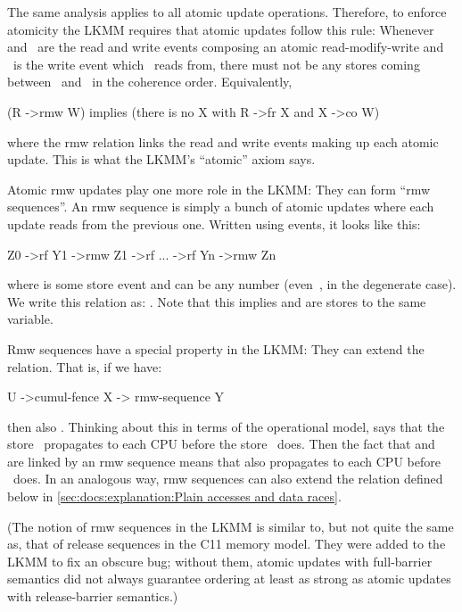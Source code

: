 The same analysis applies to all atomic update operations.
Therefore, to enforce atomicity the LKMM requires that atomic
updates follow this rule:
Whenever  and~ are the read and write events composing an
atomic read-modify-write and ~is the write event which ~reads from,
there must not be any stores coming between~ and~ in the coherence
order.
Equivalently,

\begin{VerbatimU}
	(R ->rmw W) implies (there is no X with R ->fr X and X ->co W)
\end{VerbatimU}

\noindent%
where the rmw relation links the read and write events making up each
atomic update.
This is what the LKMM's ``atomic'' axiom says.

Atomic rmw updates play one more role in the LKMM\@:
They can form ``rmw sequences''.
An rmw sequence is simply a bunch of atomic updates where
each update reads from the previous one.
Written using events, it looks like this:

\begin{VerbatimU}
	Z0 ->rf Y1 ->rmw Z1 ->rf ... ->rf Yn ->rmw Zn
\end{VerbatimU}

\noindent%
where  is some store event and  can be any number (even~, in the
degenerate case).
We write this relation as{:} .
Note that this implies  and  are stores to the same variable.

Rmw sequences have a special property in the LKMM\@:
They can extend the  relation.
That is, if we have:

\begin{VerbatimU}
	U ->cumul-fence X -> rmw-sequence Y
\end{VerbatimU}

\noindent%
then also .  Thinking about this in terms of the
operational model,  says that the store~ propagates
to each CPU before the store~ does.
Then the fact that  and~ are linked by an rmw sequence
means that  also propagates to each CPU before ~does.
In an analogous way, rmw sequences can also extend the
 relation defined below
in \cref{sec:docs:explanation:Plain accesses and data races}.

(The notion of rmw sequences in the LKMM is similar to, but not quite
the same as, that of release sequences in the C11 memory model.
They were added to the LKMM to fix an obscure bug; without them, atomic
updates with full-barrier semantics did not always guarantee ordering
at least as strong as atomic updates with release-barrier semantics.)


